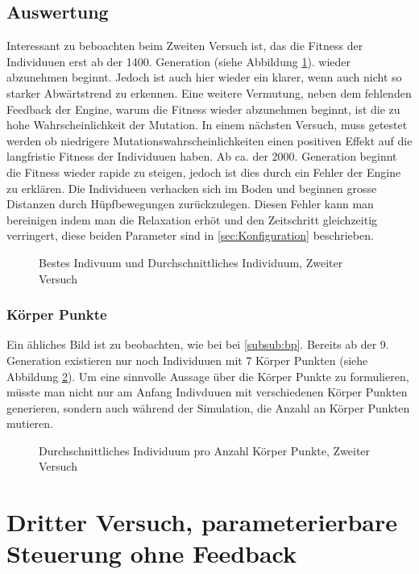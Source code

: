     \subsection{Auswertung}
      Interessant zu beboachten beim Zweiten Versuch ist, das die Fitness der Individuuen erst ab der 1400. Generation (siehe Abbildung \ref{fig:graphSecond}).
      wieder abzunehmen beginnt. Jedoch ist auch hier wieder ein klarer, wenn auch nicht so starker Abwärtstrend zu erkennen.
      Eine weitere Vermutung, neben dem fehlenden Feedback der Engine, warum die Fitness wieder abzunehmen beginnt,
      ist die zu hohe Wahrscheinlichkeit der Mutation. In einem nächsten Versuch, muss getestet werden ob niedrigere Mutationswahrscheinlichkeiten
      einen positiven Effekt auf die langfristie Fitness der Individuuen haben. Ab ca. der 2000. Generation beginnt die Fitness wieder rapide zu steigen,
      jedoch ist dies durch ein Fehler der Engine zu erklären. Die Individueen verhacken sich im Boden und beginnen grosse Distanzen durch Hüpfbewegungen zurückzulegen.
      Diesen Fehler kann man bereinigen indem man die Relaxation erhöt und den Zeitschritt gleichzeitig verringert, diese beiden Parameter sind in \ref{sec:Konfiguration} beschrieben.
        \begin{figure}
          
          \caption{Bestes Indivuum und Durchschnittliches Individuum, Zweiter Versuch}
          \label{fig:graphSecond}
        \end{figure}

    \subsubsection{Körper Punkte}
      Ein ähliches Bild ist zu beobachten, wie bei bei \ref{subsub:bp}.
      Bereits ab der 9. Generation existieren nur noch Individuuen mit 7 Körper Punkten (siehe Abbildung \ref{fig:graphBpSecond}).
      Um eine sinnvolle Aussage über die Körper Punkte zu formulieren, müsste man nicht nur am Anfang Indivduuen mit verschiedenen Körper Punkten generieren,
      sondern auch während der Simulation, die Anzahl an Körper Punkten mutieren.
    \begin{figure}
      
      \caption{Durchschnittliches Individuum pro Anzahl Körper Punkte, Zweiter Versuch}
      \label{fig:graphBpSecond}
    \end{figure}

    \section{Dritter Versuch, parameterierbare Steuerung ohne Feedback}

